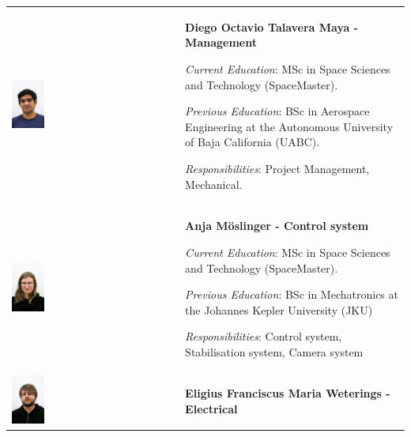 \begin{longtable}[]{m{} m{}}



\includegraphics[width=0.2\textwidth]{0-cover/img/TEAMPICS/Diego_final.jpg} & \textbf{Diego Octavio Talavera Maya - Management}

\smallskip
\textit{Current Education}: MSc in Space Sciences and Technology (SpaceMaster).

\smallskip
\textit{Previous Education}: BSc in Aerospace Engineering at the Autonomous University of Baja California (UABC).

\smallskip
\textit{Responsibilities}: Project Management, Mechanical.
\bigskip
\\

\includegraphics[width=0.2\textwidth]{0-cover/img/TEAMPICS/Anja_final.jpg}  & \textbf{Anja M\"oslinger - Control system}

\smallskip
\textit{Current Education}: MSc in Space Sciences and Technology (SpaceMaster).

\smallskip
\textit{Previous Education}: BSc in Mechatronics at the Johannes Kepler University (JKU)

\smallskip
\textit{Responsibilities}: Control system, Stabilisation system, Camera system
\bigskip
\\

\includegraphics[width=0.2\textwidth]{0-cover/img/TEAMPICS/Elrick_final.jpg}  & \textbf{Eligius Franciscus Maria Weterings - Electrical}


\end{longtable}
